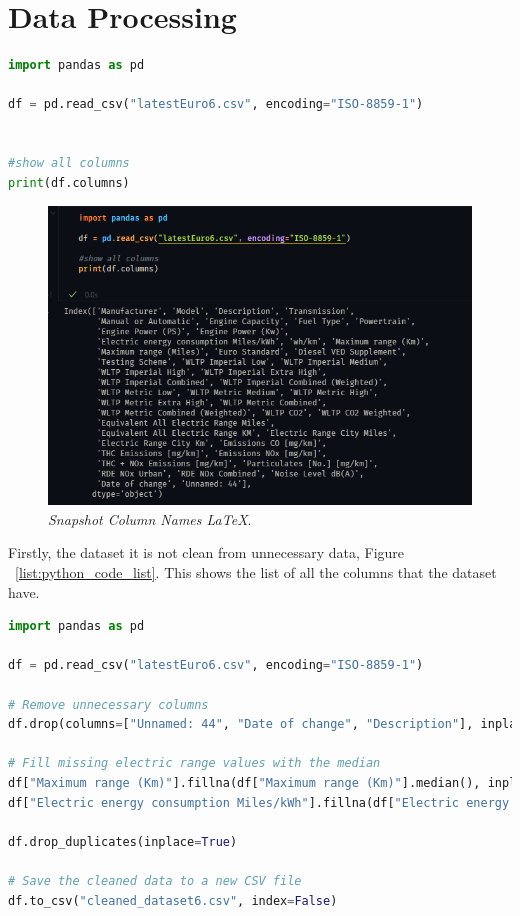 \section{Data Processing}
\begin{lstlisting}[language=Python, caption={Code snippet in \LaTeX ~and  this is a Python code }, label=list:python_code_ex]
import pandas as pd

df = pd.read_csv("latestEuro6.csv", encoding="ISO-8859-1")


#show all columns
print(df.columns)
\end{lstlisting}
\begin{figure}[H]
    \centering
    \includegraphics[scale=0.85]{figures/ColumnNames.png}
    \caption{\textit{Snapshot Column Names \LaTeX}.}
    \label{fig:chart_1}
\end{figure}

Firstly, the dataset it is not clean from unnecessary data, Figure ~\ref{list:python_code_list}. This shows the list of all the columns that the dataset have.

\begin{lstlisting}[language=Python, caption={Code snippet in \LaTeX ~and  this is a Python code, removind unnesesary data }, label=list:python_code_list]
import pandas as pd

df = pd.read_csv("latestEuro6.csv", encoding="ISO-8859-1")

# Remove unnecessary columns
df.drop(columns=["Unnamed: 44", "Date of change", "Description"], inplace=True)

# Fill missing electric range values with the median
df["Maximum range (Km)"].fillna(df["Maximum range (Km)"].median(), inplace=True)
df["Electric energy consumption Miles/kWh"].fillna(df["Electric energy consumption Miles/kWh"].median(), inplace=True)

df.drop_duplicates(inplace=True)

# Save the cleaned data to a new CSV file
df.to_csv("cleaned_dataset6.csv", index=False)

\end{lstlisting}

